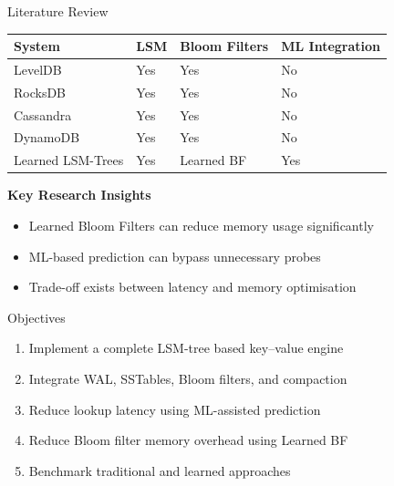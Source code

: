 \documentclass[11pt]{beamer}
\begin{document}
\begin{frame}{Literature Review}

\small

\begin{table}
\centering
\begin{tabular}{>{\raggedright}p{2.2cm} >{\centering}p{1.8cm} >{\centering}p{2cm} >{\centering\arraybackslash}p{2cm}}

\toprule
\textbf{System} & \textbf{LSM} & \textbf{Bloom Filters} & \textbf{ML Integration} \\
\midrule

LevelDB & Yes & Yes & No \\
RocksDB & Yes & Yes & No \\
Cassandra & Yes & Yes & No \\
DynamoDB & Yes & Yes & No \\
Learned LSM-Trees & Yes & Learned BF & Yes \\

\bottomrule
\end{tabular}
\end{table}

\vspace{4mm}

\textbf{Key Research Insights}
\begin{itemize}
    \item Learned Bloom Filters can reduce memory usage significantly
    \item ML-based prediction can bypass unnecessary probes
    \item Trade-off exists between latency and memory optimisation
\end{itemize}

\end{frame}

\begin{frame}{Objectives}

\begin{enumerate}
    \item Implement a complete LSM-tree based key--value engine
    \item Integrate WAL, SSTables, Bloom filters, and compaction
    \item Reduce lookup latency using ML-assisted prediction
    \item Reduce Bloom filter memory overhead using Learned BF
    \item Benchmark traditional and learned approaches
\end{enumerate}
\end{frame}
\end{document}
